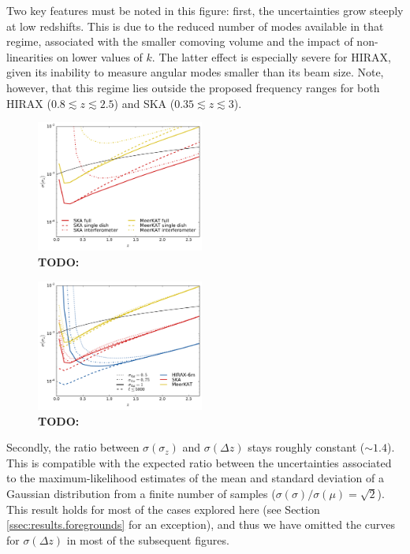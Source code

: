 \documentclass[prd,twocolumn]{revtex4}
\newcommand{\TODO}[1]{{\bf TODO:} \textcolor{red}{#1}}
\begin{document}
    Two key features must be noted in this figure: first, the uncertainties grow steeply at low
    redshifts. This is due to the reduced number of modes available in that regime, associated
    with the smaller comoving volume and the impact of non-linearities on lower values of $k$.
    The latter effect is especially severe for HIRAX, given its inability to measure angular modes
    smaller than its beam size. Note, however, that this regime lies outside the proposed frequency
    ranges for both HIRAX ($0.8\lesssim z\lesssim2.5$) and SKA ($0.35\lesssim z\lesssim3$).
    \begin{figure}
      \centering
      \includegraphics[width=0.49\textwidth]{compare_if_sd}
      \caption{\TODO{}}
      \label{fig:compare_if_sd}
    \end{figure}
    \begin{figure}
      \centering
      \includegraphics[width=0.49\textwidth]{compare_nlin}
      \caption{\TODO{}}
      \label{fig:compare_nlin}
    \end{figure}
    
    Secondly, the ratio between $\sigma(\sigma_z)$ and $\sigma(\Delta z)$ stays roughly constant
    ($\sim1.4$). This is compatible with the expected ratio between the uncertainties associated
    to the maximum-likelihood estimates of the mean and standard deviation of a Gaussian
    distribution from a finite number of samples ($\sigma(\sigma)/\sigma(\mu)=\sqrt{2}$).
    This result holds for most of the cases explored here (see Section
    \ref{ssec:results.foregrounds} for an exception), and thus we have omitted the curves for
    $\sigma(\Delta z)$ in most of the subsequent figures.
    
\end{document}
